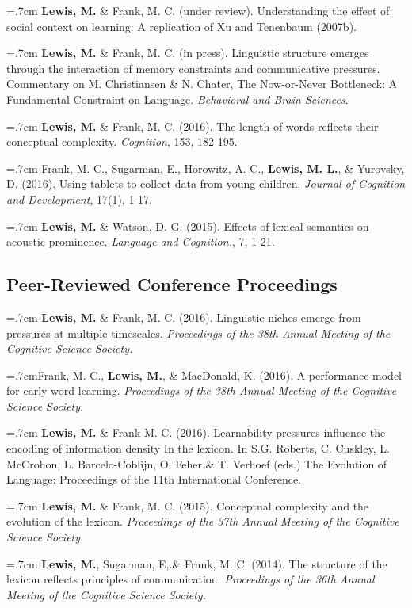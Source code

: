 \documentclass[letterpaper]{article}
\begin{document}
\onehalfspacing


  \hangindent=.7cm {\bf Lewis, M.} \& Frank, M. C. (under review). Understanding the effect of social context on learning: A replication of Xu and Tenenbaum (2007b).

 \hangindent=.7cm {\bf Lewis, M.} \& Frank, M. C. (in press). Linguistic structure emerges through the interaction of memory constraints and communicative pressures. Commentary on M. Christiansen \& N. Chater, The Now-or-Never Bottleneck: A Fundamental Constraint on Language. {\it Behavioral and Brain Sciences}.
 
  \hangindent=.7cm {\bf Lewis, M.} \& Frank, M. C. (2016). The length of words reflects their conceptual complexity. {\it Cognition}, 153, 182-195.

 \hangindent=.7cm Frank, M. C., Sugarman, E., Horowitz, A. C., {\bf Lewis, M. L.}, \& Yurovsky, D. (2016). Using tablets to collect data from young children. {\it Journal of Cognition and Development}, 17(1), 1-17. 
 
  \hangindent=.7cm {\bf Lewis, M.} \& Watson, D. G. (2015). Effects of lexical semantics on acoustic prominence. { \it Language and Cognition.}, 7, 1-21. 

  
  \subsection*{Peer-Reviewed Conference Proceedings} 
  \hangindent=.7cm {\bf Lewis, M.} \& Frank, M. C. (2016). Linguistic niches emerge from pressures at multiple timescales. { \it Proceedings of the 38th Annual Meeting of the Cognitive Science Society.}

   \hangindent=.7cmFrank, M. C.,  {\bf Lewis, M.}, \& MacDonald, K. (2016). A performance model for early word learning.  { \it Proceedings of the 38th Annual Meeting of the Cognitive Science Society.}

  \hangindent=.7cm {\bf Lewis, M.} \& Frank M. C. (2016). Learnability pressures influence the encoding of information density In the lexicon. In S.G. Roberts, C. Cuskley, L. McCrohon, L. Barcelo-Coblijn, O. Feher \& T. Verhoef (eds.) The Evolution of Language: Proceedings of the 11th International Conference.


 \hangindent=.7cm {\bf Lewis, M.} \& Frank, M. C. (2015). Conceptual complexity and the evolution of the lexicon. { \it Proceedings of the 37th Annual Meeting of the Cognitive Science Society.}
 
 \hangindent=.7cm {\bf Lewis, M.}, Sugarman, E,.\& Frank, M. C. (2014). The structure of the lexicon reflects principles of communication. { \it Proceedings of the 36th Annual Meeting of the Cognitive Science Society.}
  
\end{document}
